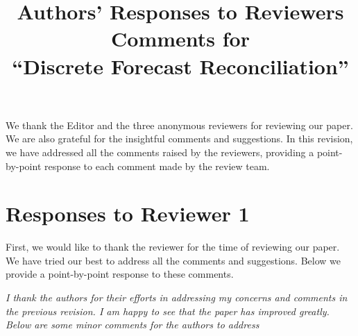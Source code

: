 \documentclass[11pt,a4paper]{article}
\title{\bf\Large Authors' Responses to Reviewers Comments for \\
  ``Discrete Forecast Reconciliation'' }
\author{}
\date{}
\newcommand{\RE}[2][Re:~]{{\color{blue}\textbf{#1}#2}}
\begin{document}
\maketitle

\RE[]{We thank the Editor and the three anonymous reviewers for reviewing our paper. We are also grateful for the insightful comments and suggestions. In this revision, we have addressed all the comments raised by the reviewers, providing a point-by-point response to each comment made by the review team.}

\section*{Responses to Reviewer 1}\label{reviewer-1-comments}

\RE[]{First, we would like to thank the reviewer for the time of reviewing our paper. We have tried our best to address all the comments and suggestions. Below we provide a point-by-point response to these comments.}

\textit{I thank the authors for their efforts in addressing my concerns and comments in the previous
revision. I am happy to see that the paper has improved greatly. Below are some minor
comments for the authors to address}
\end{document}
